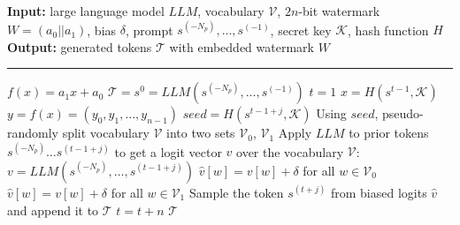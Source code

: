\documentclass[a4paper,11pt]{llncs}
\begin{document}
\begin{algorithm*}[tbp]
\caption{Watermark Embedding}
\label{alg:watermark_embedding}
\begin{algorithmic}[1]
\State \textbf{Input:} large language model $LLM$, vocabulary $\mathcal{V}$, $2n$-bit watermark $W=(a_0||a_1)$, bias $\delta$, prompt $s^{(-N_p)}, \dots, s^{(-1)}$, secret key $\mathcal{K}$, hash function $H$
\State \textbf{Output:} generated tokens $\mathcal{T}$ with embedded watermark $W$
     \vspace{2mm}
    \hrule
     \vspace{2mm}
    \State $f(x) = a_1x+a_0$ 
    \State $\mathcal{T}=s^{0} = LLM(s^{(-N_p)}, \dots, s^{(-1)})$ 
    \State $t=1$ 
        \State $x = H(s^{t-1}, \mathcal{K})$ 
        \State $y=f(x)=(y_{0},y_{1},\ldots,y_{n-1})$ 
         
            \State $seed = H(s^{t-1+j}, \mathcal{K})$
            \State Using $seed$, pseudo-randomly split vocabulary $\mathcal{V}$ into two sets $\mathcal{V}_0$, $\mathcal{V}_1$
            \State Apply $LLM$ to prior tokens $s^{(-N_p)} \dots s^{(t-1+j)}$ to get a logit vector $v$ over the vocabulary $\mathcal{V}$:
            \State $v = LLM(s^{(-N_p)}, \dots, s^{(t-1+j)})$
                \State $\hat{v}[w]=v[w]+\delta$ for all $w\in \mathcal{V}_0$ 
            \Else
                \State $\hat{v}[w]=v[w]+\delta$ for all $w\in \mathcal{V}_1$
            \EndIf
            \State Sample the token $s^{(t+j)}$ from biased logits $\hat{v}$ and append it to $\mathcal{T}$
        \EndFor
        \State $t=t+n$
    \EndWhile
    \State \Return $\mathcal{T}$
\end{algorithmic}
\end{algorithm*}
\end{document}
